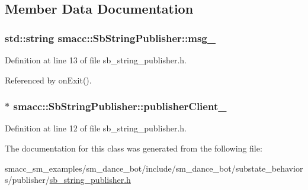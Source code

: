 \subsection{Member Data Documentation}
\subsubsection[{\texorpdfstring{msg\+\_\+}{msg_}}]{\setlength{\rightskip}{0pt plus 5cm}std\+::string smacc\+::\+Sb\+String\+Publisher\+::msg\+\_\+}\hypertarget{classsmacc_1_1SbStringPublisher_ad3397fa2bb3097192c3f82d243704741}{}\label{classsmacc_1_1SbStringPublisher_ad3397fa2bb3097192c3f82d243704741}


Definition at line 13 of file sb\+\_\+string\+\_\+publisher.\+h.



Referenced by on\+Exit().

\subsubsection[{\texorpdfstring{publisher\+Client\+\_\+}{publisherClient_}}]{$\ast$ smacc\+::\+Sb\+String\+Publisher\+::publisher\+Client\+\_\+}\hypertarget{classsmacc_1_1SbStringPublisher_a85fd3ba65479542c9f5e02ffa727cf4c}{}\label{classsmacc_1_1SbStringPublisher_a85fd3ba65479542c9f5e02ffa727cf4c}


Definition at line 12 of file sb\+\_\+string\+\_\+publisher.\+h.



The documentation for this class was generated from the following file\+:\begin{DoxyCompactItemize}
\item 
smacc\+\_\+sm\+\_\+examples/sm\+\_\+dance\+\_\+bot/include/sm\+\_\+dance\+\_\+bot/substate\+\_\+behaviors/publisher/\hyperlink{sb__string__publisher_8h}{sb\+\_\+string\+\_\+publisher.\+h}\end{DoxyCompactItemize}
